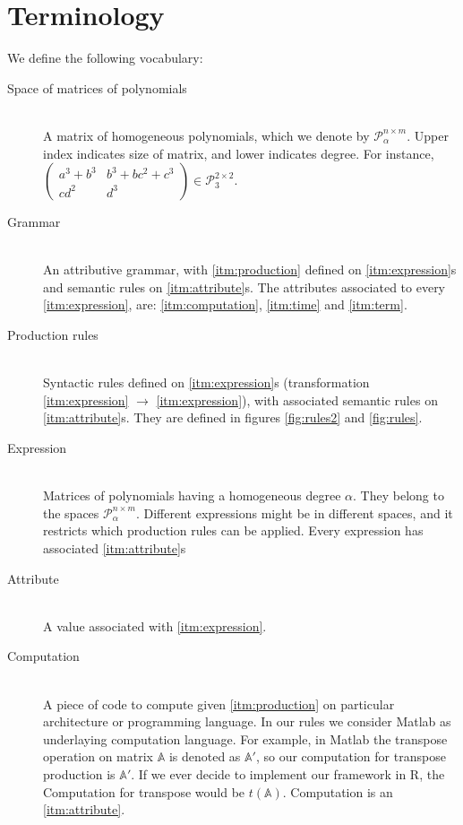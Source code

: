\section{Terminology}
We define the following vocabulary: 

\begin{description}
  \item[Space of matrices of polynomials\label{itm:spacematrices}] \hfill \\ A matrix of homogeneous polynomials, which we denote by $\mathcal{P}^{n \times m}_{\alpha}$. Upper index indicates size of matrix, and lower indicates degree. For instance, $\begin{pmatrix} a^3 + b^3 & b^3 + bc^2 + c^3\\ cd^2 & d^3 \end{pmatrix} \in \mathcal{P}^{2 \times 2}_3$. 

\item[Grammar\label{itm:grammar}] \hfill \\ An attributive grammar, with \ref{itm:production} defined on \ref{itm:expression}s and semantic rules on \ref{itm:attribute}s. The attributes associated to every \ref{itm:expression}, are: \ref{itm:computation}, \ref{itm:time} and \ref{itm:term}.

\item[Production rules\label{itm:production}] \hfill \\ Syntactic rules defined on \ref{itm:expression}s (transformation \ref{itm:expression} $\rightarrow$ \ref{itm:expression}), with associated semantic rules on \ref{itm:attribute}s. They are defined in figures \ref{fig:rules2} and \ref{fig:rules}.

\item[Expression\label{itm:expression}] \hfill \\ Matrices of polynomials having a homogeneous degree $\alpha$. They belong to the spaces $\mathcal{P}^{n \times m}_\alpha$. Different expressions might be in different spaces, and it restricts which production rules can be applied. Every expression has associated \ref{itm:attribute}s

\item[Attribute\label{itm:attribute}] \hfill \\
  A value associated with \ref{itm:expression}. 

\item[Computation\label{itm:computation}] \hfill \\ A piece of code to compute given \ref{itm:production} on particular architecture or programming language. In our rules we consider Matlab as
  underlaying computation language. For example, in Matlab the transpose
  operation on matrix $\mathbb{A}$ is denoted as $\mathbb{A}'$, so our computation
  for transpose production is $\mathbb{A}'$. If we ever decide to implement our framework in R,
  the Computation for transpose would be $t(\mathbb{A})$. Computation is an \ref{itm:attribute}.


\end{description}
